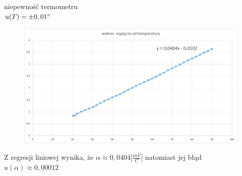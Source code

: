 \documentclass{article}
\begin{document}
niepewność termometru\\
$u(T)=\pm0,01\degree$\\
\begin{figure}[h]
    \begin{center}
    \includegraphics[width=14cm]{wykres.PNG}
    \end{center}
\end{figure}
Z regresji liniowej wynika, że $\alpha\approx0,0404\lbrack\frac{mV}{C}\rbrack$ natomiast jej błąd $u(\alpha)\approx0,00012$\\
\end{document}
